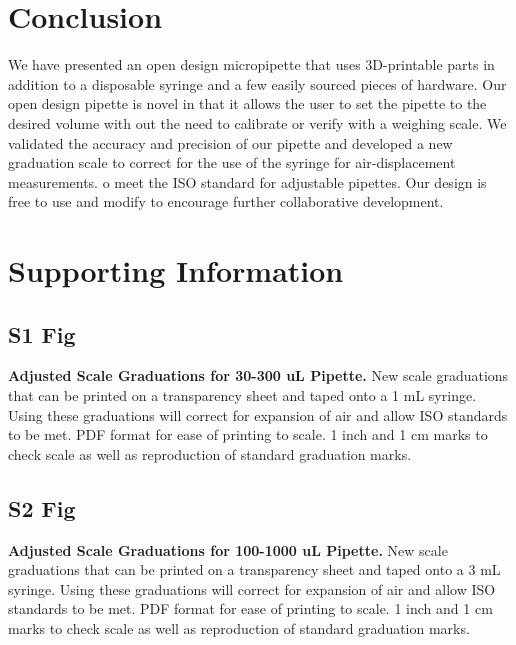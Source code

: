\documentclass[10pt,letterpaper]{article}
\begin{document}
\section*{Conclusion}
We have presented an open design micropipette that uses 3D-printable parts in addition to a disposable syringe and a few easily sourced pieces of hardware.
Our open design pipette is novel in that it allows the user to set the pipette to the desired volume with out the need to calibrate or verify with a weighing scale. 
We validated the accuracy and precision of our pipette and developed a new graduation scale to correct for the use of the syringe for air-displacement measurements.
o meet the ISO standard for adjustable pipettes.
Our design is free to use and modify to encourage further collaborative development.




\section*{Supporting Information}

\subsection*{S1 Fig}
\label{S1_Fig}
{\bf Adjusted Scale Graduations for 30-300 uL Pipette.} New scale graduations that can be printed on a transparency sheet and taped onto a 1 mL syringe. Using these graduations will correct for expansion of air and allow ISO standards to be met. PDF format for ease of printing to scale. 1 inch and 1 cm marks to check scale as well as reproduction of standard graduation marks.

\subsection*{S2 Fig}
\label{S2_Fig}
{\bf Adjusted Scale Graduations for 100-1000 uL Pipette.} New scale graduations that can be printed on a transparency sheet and taped onto a 3 mL syringe. Using these graduations will correct for expansion of air and allow ISO standards to be met. PDF format for ease of printing to scale. 1 inch and 1 cm marks to check scale as well as reproduction of standard graduation marks.

\nolinenumbers



\end{document}
